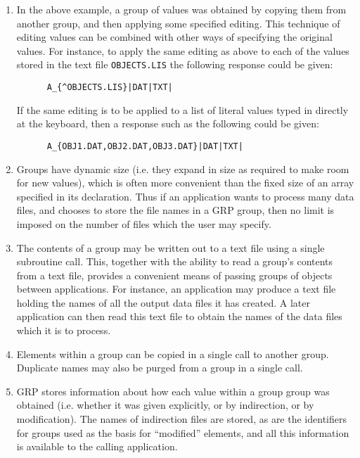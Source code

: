 \begin{enumerate}
\item In the above example, a group of values was obtained by copying them from
another group, and then applying some specified editing. This technique of
editing values can be combined with other ways of specifying the original
values. For instance, to apply the same editing as above to each of the values
stored in the text file {\tt OBJECTS.LIS} the following response could be given:

\small
\begin{verbatim}
      A_{^OBJECTS.LIS}|DAT|TXT|
\end{verbatim}
\normalsize

If the same editing is to be applied to a list of literal values typed in
directly at the keyboard, then a response such as the following could be given:

\small
\begin{verbatim}
      A_{OBJ1.DAT,OBJ2.DAT,OBJ3.DAT}|DAT|TXT|
\end{verbatim}
\normalsize

\item Groups have dynamic size (i.e. they expand in size as required to make
room for new values), which is often more convenient than the fixed size of an
array specified in its declaration. Thus if an application wants to process
many data files, and chooses to store the file names in a GRP group, then no
limit is imposed on the number of files which the user may specify.

\item The contents of a group may be written out to a text file using a single
subroutine call. This, together with the ability to read a group's contents
from a text file, provides a convenient means of passing groups of objects
between applications. For instance, an application may produce a text file
holding the names of all the output data files it has created. A later
application can then read this text file to obtain the names of the data files
which it is to process.

\item Elements within a group can be copied in a single call to another group.
Duplicate names may also be purged from a group in a single call.

\item GRP stores information about how each value within a group group was
obtained (i.e. whether it was given explicitly, or by indirection, or by
modification). The names of indirection files are stored, as are the identifiers
for groups used as the basis for ``modified'' elements, and all this information
is available to the calling application.

\end{enumerate}

